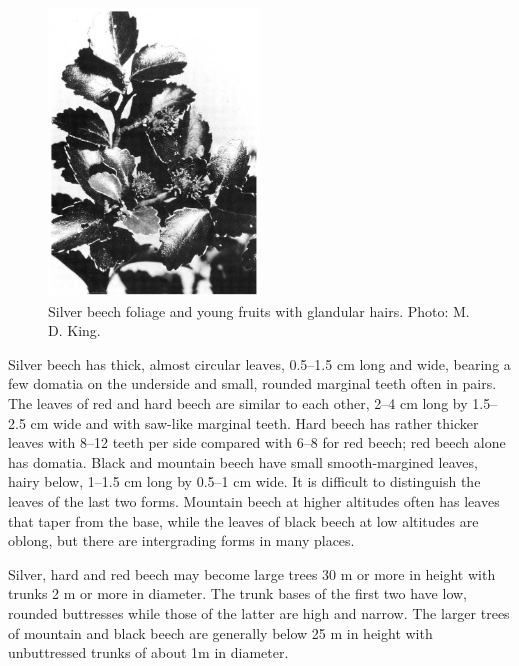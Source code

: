 \begin{figure}
	\includegraphics[width=0.5\textwidth]{graphics/figure69silverbeech.jpg}
	\centering
	\caption[Silver beech foliage and young fruits]{Silver beech foliage and young fruits with glandular hairs.
	Photo: M. D. King.}%
	\label{fig:69silverbeech}
\end{figure}

Silver beech has thick, almost circular leaves, 0.5--1.5 cm long and wide, bearing a few domatia on the underside and small, rounded marginal teeth often in pairs.
The leaves of red and hard beech are similar to each other, 2--4 cm long by 1.5--2.5 cm wide and with saw-like marginal teeth.
Hard beech has rather thicker leaves with 8--12 teeth per side compared with 6--8 for red beech; red beech alone has domatia.
Black and mountain beech have small smooth-margined leaves, hairy below, 1--1.5 cm long by 0.5--1 cm wide.
It is difficult to distinguish the leaves of the last two forms.
Mountain beech at higher altitudes often has leaves that taper from the base, while the leaves of black beech at low altitudes are oblong, but there are intergrading forms in many places.

Silver, hard and red beech may become large trees 30 m or more in height with trunks 2 m or more in diameter.
The trunk bases of the first two have low, rounded buttresses while those of the latter are high and narrow.
The larger trees of mountain and black beech are generally below 25 m in height with unbuttressed trunks of about 1m in diameter.

